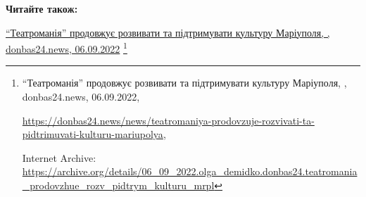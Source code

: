  
 
 
 
 

\def\pubIA{https://archive.org/details/06_09_2022.olga_demidko.donbas24.teatromania_prodovzhue_rozv_pidtrym_kulturu_mrpl}
\def\pubTitle{\enquote{Театроманія} продовжує розвивати та підтримувати культуру Маріуполя}
\def\pubDate{06.09.2022}
\def\pubOrigin{https://donbas24.news/news/teatromaniya-prodovzuje-rozvivati-ta-pidtrimuvati-kulturu-mariupolya}
\def\pubAuthor{\pubAuthorDemidko}

\textbf{Читайте також:}\par\href{\pubIA}{%
\pubTitle, \pubAuthor, donbas24.news, \pubDate}%
\footnote{\pubTitle, \pubAuthor, donbas24.news, \pubDate, \par\url{\pubOrigin}, \par Internet Archive: \url{\pubIA}}
